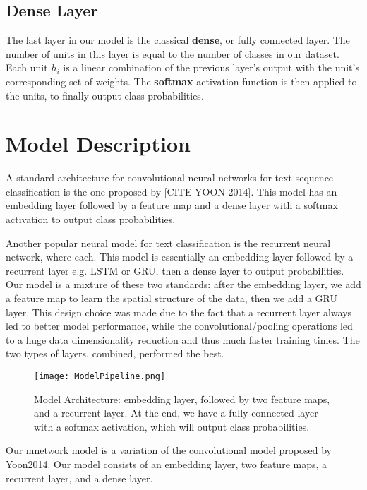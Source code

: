 \subsection{Dense Layer}
The last layer in our model is the classical \textbf{dense}, or fully connected layer.
The number of units in this layer is equal to the number of classes in our dataset.
Each unit $h_i$ is a linear combination of the previous layer's output with the unit's
corresponding set of weights. The \textbf{softmax} activation function is then applied to
the units, to finally output class probabilities.


\section{Model Description}

A standard architecture for convolutional neural networks for text sequence classification is the one proposed by
[CITE YOON 2014]. This model has an embedding layer followed by a feature map and a dense layer with a softmax activation
to output class probabilities.

Another popular neural model for text classification is the recurrent neural network, where each. This model is
essentially an embedding layer followed by a recurrent layer e.g. LSTM or GRU, then a dense layer to output probabilities.
Our model is a mixture of these two standards: after the embedding layer, we add a feature map to learn the spatial
structure of the data, then we add a GRU layer. This design choice was made due to the fact that a recurrent layer
always led to better model performance, while the convolutional/pooling operations led to a huge data dimensionality reduction
and thus much faster training times. The two types of layers, combined, performed the best.


\begin{figure}[h]
\caption{Model Architecture: embedding layer, followed by two feature maps, and a recurrent layer. At the end, we have
a fully connected layer with a softmax activation, which will output class probabilities.}
\centering
\texttt{[image: ModelPipeline.png]}
\end{figure}

Our mnetwork model is a variation of the convolutional model proposed by Yoon2014.
Our model consists of an embedding layer, two feature maps, a recurrent layer, and a dense layer.

